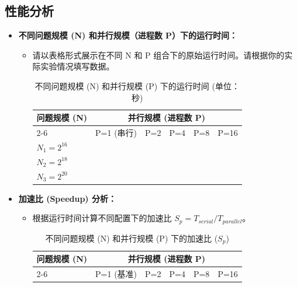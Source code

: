 \documentclass{SYSUReport}
\begin{document}
\subsection{性能分析}
\begin{itemize}
    \item \textbf{不同问题规模 (N) 和并行规模（进程数 P）下的运行时间：}
    \begin{itemize}
        \item 请以表格形式展示在不同 N 和 P 组合下的原始运行时间。请根据你的实际实验情况填写数据。
      \begin{table}[h!]
        \centering
        \caption{不同问题规模 (N) 和并行规模 (P) 下的运行时间 (单位：秒)}
        \label{tab:runtime_results_optimized}
        \begin{tabular}{@{}lccccc@{}}
        \toprule
        \multirow{2}{*}{问题规模 (N)} & \multicolumn{5}{c}{并行规模 (进程数 P)} \\
        \cmidrule(l){2-6}
                                  & P=1 (串行) & P=2    & P=4    & P=8    & P=16 \\ \midrule
        $N_1 = 2^{16} $   &            &        &        &        &             \\
        $N_2 = 2^{18}$  &            &        &        &        &             \\
        $N_3 = 2^{20}$&            &        &        &        &             \\
        \bottomrule
        \end{tabular}
        \end{table}
    \end{itemize}
    \item \textbf{加速比 (Speedup) 分析：}
    \begin{itemize}
        \item 根据运行时间计算不同配置下的加速比 $S_p = T_{serial} / T_{parallel}$。
        \begin{table}[h!]
        \centering
        \caption{不同问题规模 (N) 和并行规模 (P) 下的加速比 ($S_p$)}
        \label{tab:speedup_results}
        \begin{tabular}{@{}lccccc@{}}
        \toprule
        \multirow{2}{*}{问题规模 (N)} & \multicolumn{5}{c}{并行规模 (进程数 P)} \\
        \cmidrule(l){2-6}
                                  & P=1 (基准) & P=2    & P=4    & P=8    & P=16\\ \midrule

\end{tabular}
\end{table}
\end{itemize}
\end{itemize}
\end{document}
